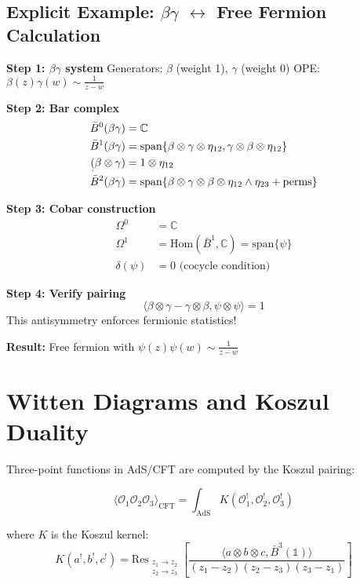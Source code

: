 \subsection{Explicit Example: $\beta\gamma$ $\leftrightarrow$ Free Fermion Calculation}

\begin{calculation}
\textbf{Step 1: $\beta\gamma$ system}
Generators: $\beta$ (weight 1), $\gamma$ (weight 0)
OPE: $\beta(z)\gamma(w) \sim \frac{1}{z-w}$

\textbf{Step 2: Bar complex}
\begin{align}
\bar{B}^0(\beta\gamma) &= \mathbb{C} \\
\bar{B}^1(\beta\gamma) &= \text{span}\{\beta \otimes \gamma \otimes \eta_{12}, \gamma \otimes \beta \otimes \eta_{12}\} \\
\d(\beta \otimes \gamma) &= 1 \otimes \eta_{12} \\
\bar{B}^2(\beta\gamma) &= \text{span}\{\beta \otimes \gamma \otimes \beta \otimes \eta_{12} \wedge \eta_{23} + \text{perms}\}
\end{align}

\textbf{Step 3: Cobar construction}
\begin{align}
\Omega^0 &= \mathbb{C} \\
\Omega^1 &= \text{Hom}(\bar{B}^1, \mathbb{C}) = \text{span}\{\psi\} \\
\delta(\psi) &= 0 \text{ (cocycle condition)}
\end{align}

\textbf{Step 4: Verify pairing}
$$\langle \beta \otimes \gamma - \gamma \otimes \beta, \psi \otimes \psi \rangle = 1$$
This antisymmetry enforces fermionic statistics!

\textbf{Result:} Free fermion with $\psi(z)\psi(w) \sim \frac{1}{z-w}$
\end{calculation}

\section{Witten Diagrams and Koszul Duality}

\begin{technique}[Witten Diagram = Koszul Pairing]
Three-point functions in AdS/CFT are computed by the Koszul pairing:

$$\langle \mathcal{O}_1 \mathcal{O}_2 \mathcal{O}_3 \rangle_{\text{CFT}} = \int_{\text{AdS}} K(\mathcal{O}_1^!, \mathcal{O}_2^!, \mathcal{O}_3^!)$$

where $K$ is the Koszul kernel:
$$K(a^!, b^!, c^!) = \text{Res}_{\substack{z_1 \to z_2 \\ z_2 \to z_3}} \left[\frac{\langle a \otimes b \otimes c, \bar{B}^3(\mathbb{1}) \rangle}{(z_1-z_2)(z_2-z_3)(z_3-z_1)}\right]$$
\end{technique}

